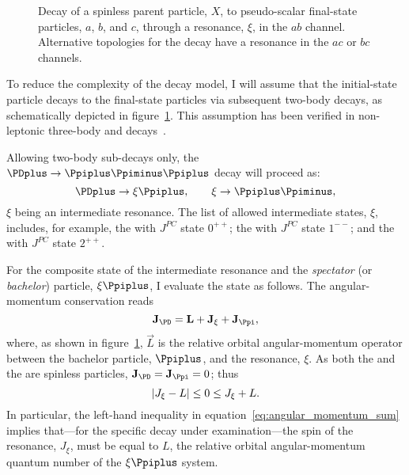     \begin{figure}
        \centering
        
        \caption[Decay of a spinless parent particle to pseudo-scalar final-state particles through a resonance.]%
                {Decay of a spinless parent particle, $X$, to pseudo-scalar final-state particles, $a$, $b$, and $c$, through a resonance, $\xi$, in the $ab$ channel.
                 Alternative topologies for the decay have a resonance in the $ac$ or $bc$ channels.}
        \label{fig:isobar_three_body_decay}
    \end{figure}
    To reduce the complexity of the decay model, I will assume that the initial-state particle decays to the final-state particles via subsequent two-body decays, as schematically depicted in figure~\ref{fig:isobar_three_body_decay}.
    This assumption has been verified in non-leptonic three-body \PD{} and \PB{} decays~\cite[\S~13.2]{Bevan:2014iga}.


    Allowing two-body sub-decays only, the $\PDplus \to \Ppiplus\Ppiminus\Ppiplus$ decay will proceed as:
    \begin{equation}
        \PDplus\to\xi\Ppiplus,\qquad
        \xi\to\Ppiplus\Ppiminus,
    \end{equation}
    $\xi$ being an intermediate resonance.
    The list of allowed intermediate states, $\xi$, includes, for example, the \Pfnez{} with $J^{PC}$ state $0^{++}$; %
    the \Prhozero{} with $J^{PC}$ state $1^{--}$; %
    and the \Pfii{} with $J^{PC}$ state $2^{++}$. %


    For the composite state of the intermediate resonance and the \emph{spectator} (or \emph{bachelor}) particle, $\xi\Ppiplus$, I evaluate the state as follows. 
    The angular-momentum conservation reads
    \begin{equation}
        \vec{J}_{\PD} = \vec{L} + \vec{J}_{\xi} + \vec{J}_{\Ppi},
    \end{equation}
    where, as shown in figure~\ref{fig:isobar_three_body_decay}, $\vec{L}$ is the relative orbital angular-momentum operator between the bachelor particle, $\Ppiplus$, and the resonance, $\xi$. %
    As both the \Ppiplus{} and the \PDplus are spinless particles, $\vec{J}_{\PD} = \vec{J}_{\Ppi} = 0$; thus
    \begin{equation}\label{eq:angular_momentum_sum}
        \lvert J_{\xi} - L\rvert \le 0 \le J_{\xi} + L.
    \end{equation}
    In particular, the left-hand inequality in equation~\eqref{eq:angular_momentum_sum} implies that---for the specific decay under examination---the spin of the resonance, $J_\xi$, must be equal to $L$, the relative orbital angular-momentum quantum number of the $\xi\Ppiplus$ system.


